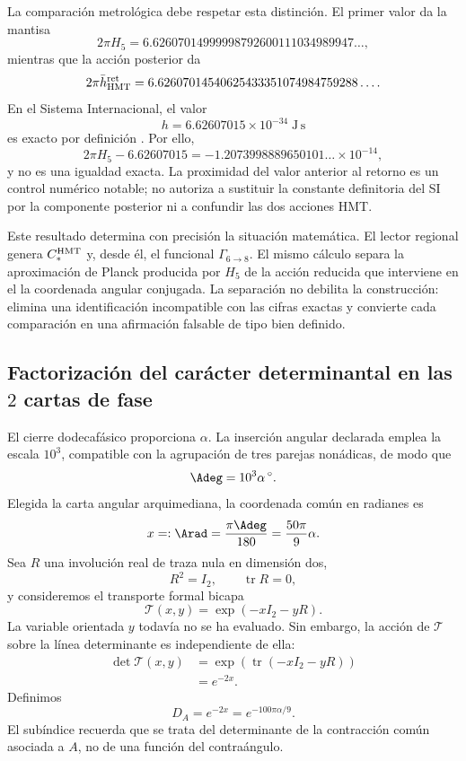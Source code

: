 La comparación metrológica debe respetar esta distinción. El primer valor da
la mantisa
\[
2\pi H_5
=6.62607014999998792600111034989947\ldots,
\]
mientras que la acción posterior da
\[
2\pi\bar h_{\rm HMT}^{\rm ret}
=6.62607014540625433351074984759288\ldots.
\]
En el Sistema Internacional, el valor
\[
h=6.62607015\times10^{-34}\;\mathrm{J\,s}
\]
es exacto por definición \cite{BIPMSI}. Por ello,
\[
2\pi H_5-6.62607015
=-1.2073998889650101\ldots\times10^{-14},
\]
y no es una igualdad exacta. La proximidad del valor anterior al retorno es
un control numérico notable; no autoriza a sustituir la constante definitoria
del SI por la componente posterior ni a confundir las dos acciones HMT\@.

Este resultado determina con precisión la situación matemática. El lector
regional genera \(C_*^{\rm HMT}\) y, desde él, el funcional
\(\Gamma_{6\to8}\). El mismo cálculo separa la aproximación de Planck
producida por \(H_5\) de la acción reducida que interviene en el
la coordenada angular conjugada. La separación no debilita la construcción: elimina una
identificación incompatible con las cifras exactas y convierte cada
comparación en una afirmación falsable de tipo bien definido.

\subsection{Factorización del carácter determinantal en las \texorpdfstring{\(2\)}{2} cartas de fase}
\label{sec:s102:c38:3:4}


El cierre dodecafásico proporciona \(\alpha\). La inserción angular declarada
emplea la escala \(10^3\), compatible con la agrupación de tres parejas
nonádicas, de modo que
\[
\Adeg=10^3\alpha\,{}^\circ.
\]
Elegida la carta angular arquimediana, la coordenada común en radianes es
\[
x=: \Arad=\frac{\pi\Adeg}{180}=\frac{50\pi}{9}\alpha.
\]
Sea \(R\) una involución real de traza nula en dimensión dos,
\[
R^2=I_2,
\qquad
\operatorname{tr}R=0,
\]
y consideremos el transporte formal bicapa
\[
\mathcal T(x,y)=\exp(-xI_2-yR).
\]
La variable orientada \(y\) todavía no se ha evaluado. Sin embargo, la acción
de \(\mathcal T\) sobre la línea determinante es independiente de ella:
\[
\begin{aligned}
\det\mathcal T(x,y)
&=\exp\!\left(\operatorname{tr}(-xI_2-yR)\right)\\
&=e^{-2x}.
\end{aligned}
\]
Definimos
\[
\boxed{
D_A=e^{-2x}=e^{-100\pi\alpha/9}.}
\]
El subíndice recuerda que se trata del determinante de la contracción común
asociada a \(A\), no de una función del contraángulo.


